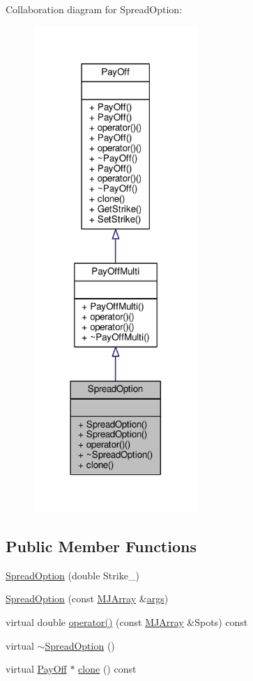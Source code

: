 Collaboration diagram for Spread\+Option\+:
\nopagebreak
\begin{figure}[H]
\begin{center}
\leavevmode
\includegraphics[width=177pt]{classSpreadOption__coll__graph}
\end{center}
\end{figure}
\subsection*{Public Member Functions}
\begin{DoxyCompactItemize}
\item 
\hyperlink{classSpreadOption_a12358b27158d510959c511273cec4cfc}{Spread\+Option} (double Strike\+\_\+)
\item 
\hyperlink{classSpreadOption_ad2c9642951b84671594320041630978f}{Spread\+Option} (const \hyperlink{classMJArray}{M\+J\+Array} \&\hyperlink{path__generation_8h_a75c13cde2074f502cc4348c70528572d}{args})
\item 
virtual double \hyperlink{classSpreadOption_ad374a8790abcf926a3a2be5fdc5676ca}{operator()} (const \hyperlink{classMJArray}{M\+J\+Array} \&Spots) const
\item 
virtual \hyperlink{classSpreadOption_a78620ae17e4161d02ae89adcb27c8571}{$\sim$\+Spread\+Option} ()
\item 
virtual \hyperlink{classPayOff}{Pay\+Off} $\ast$ \hyperlink{classSpreadOption_a872a849b2671bf96ceda5adb7a938ce7}{clone} () const
\end{DoxyCompactItemize}
